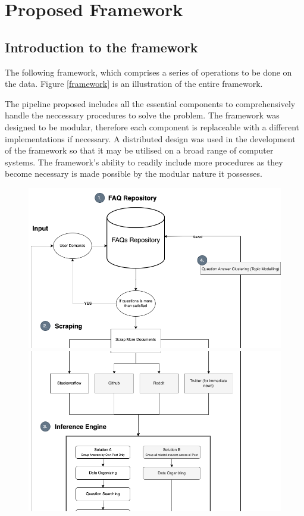 \chapter{Proposed Framework}
\section{Introduction to the framework} 
The following framework, which comprises a series of operations to be done on the data. Figure \ref{framework} is an illustration of the entire framework.

The pipeline proposed includes all the essential components to comprehensively handle the neccessary procedures to solve the problem. The framework was designed to be modular, therefore each component is replaceable with a different implementations if necessary.  A distributed design was used in the development of the framework so that it may be utilised on a broad range of computer systems. The framework's ability to readily include more procedures as they become necessary is made possible by the modular nature it possesses.

\newpage
\begin{figure}[H]
  \centerline{\includegraphics[scale=0.5]{slice_framework_1.png}}
  \centerline{\includegraphics[scale=0.5]{slice_framework_2.png}}
\end{figure} 

